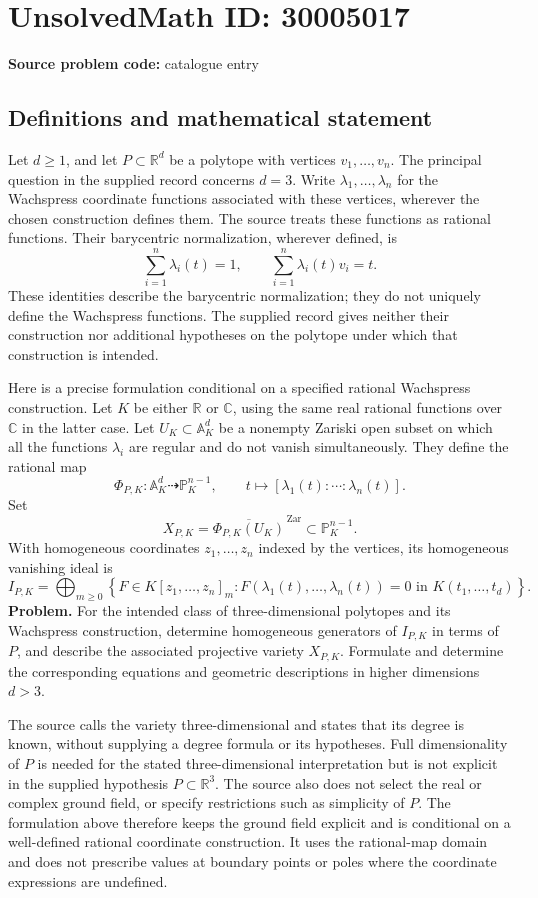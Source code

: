 \documentclass[11pt]{article}
\newcommand{\R}{\mathbb{R}}
\newcommand{\C}{\mathbb{C}}
\newcommand{\A}{\mathbb{A}}
\newcommand{\PP}{\mathbb{P}}
\begin{document}
\section*{UnsolvedMath ID: 30005017}
\textbf{Source problem code:} catalogue entry
\subsection{Definitions and mathematical statement}
Let \(d\geq 1\), and let \(P\subset\R^d\) be a polytope with vertices \(v_1,\ldots,v_n\). The principal question in the supplied record concerns \(d=3\). Write \(\lambda_1,\ldots,\lambda_n\) for the Wachspress coordinate functions associated with these vertices, wherever the chosen construction defines them. The source treats these functions as rational functions. Their barycentric normalization, wherever defined, is
\[
\sum_{i=1}^n\lambda_i(t)=1,
\qquad
\sum_{i=1}^n\lambda_i(t)v_i=t.
\]
These identities describe the barycentric normalization; they do not uniquely define the Wachspress functions. The supplied record gives neither their construction nor additional hypotheses on the polytope under which that construction is intended.

Here is a precise formulation conditional on a specified rational Wachspress construction. Let \(K\) be either \(\R\) or \(\C\), using the same real rational functions over \(\C\) in the latter case. Let \(U_K\subset\A_K^d\) be a nonempty Zariski open subset on which all the functions \(\lambda_i\) are regular and do not vanish simultaneously. They define the rational map
\[
\Phi_{P,K}\colon\A_K^d\dashrightarrow\PP_K^{n-1},
\qquad
t\longmapsto[\lambda_1(t):\cdots:\lambda_n(t)].
\]
Set
\[
X_{P,K}=\overline{\Phi_{P,K}(U_K)}^{\,\mathrm{Zar}}
\subset\PP_K^{n-1}.
\]
With homogeneous coordinates \(z_1,\ldots,z_n\) indexed by the vertices, its homogeneous vanishing ideal is
\[
I_{P,K}=\bigoplus_{m\geq0}
\left\{F\in K[z_1,\ldots,z_n]_m:
F(\lambda_1(t),\ldots,\lambda_n(t))=0
\text{ in }K(t_1,\ldots,t_d)\right\}.
\]
\textbf{Problem.} For the intended class of three-dimensional polytopes and its Wachspress construction, determine homogeneous generators of \(I_{P,K}\) in terms of \(P\), and describe the associated projective variety \(X_{P,K}\). Formulate and determine the corresponding equations and geometric descriptions in higher dimensions \(d>3\).

The source calls the variety three-dimensional and states that its degree is known, without supplying a degree formula or its hypotheses. Full dimensionality of \(P\) is needed for the stated three-dimensional interpretation but is not explicit in the supplied hypothesis \(P\subset\R^3\). The source also does not select the real or complex ground field, or specify restrictions such as simplicity of \(P\). The formulation above therefore keeps the ground field explicit and is conditional on a well-defined rational coordinate construction. It uses the rational-map domain and does not prescribe values at boundary points or poles where the coordinate expressions are undefined.
\end{document}
